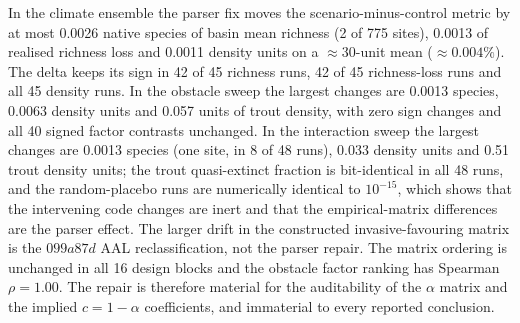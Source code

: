 \documentclass[11pt,a4paper]{article}
\begin{document}
In the climate ensemble the parser fix moves the scenario-minus-control metric by at most 0.0026 native species of basin mean richness (2 of 775 sites), 0.0013 of realised richness loss and 0.0011 density units on a $\approx30$-unit mean ($\approx0.004\%$). The delta keeps its sign in 42 of 45 richness runs, 42 of 45 richness-loss runs and all 45 density runs. In the obstacle sweep the largest changes are 0.0013 species, 0.0063 density units and 0.057 units of trout density, with zero sign changes and all 40 signed factor contrasts unchanged. In the interaction sweep the largest changes are 0.0013 species (one site, in 8 of 48 runs), 0.033 density units and 0.51 trout density units; the trout quasi-extinct fraction is bit-identical in all 48 runs, and the random-placebo runs are numerically identical to $10^{-15}$, which shows that the intervening code changes are inert and that the empirical-matrix differences are the parser effect. The larger drift in the constructed invasive-favouring matrix is the $099a87d$ AAL reclassification, not the parser repair. The matrix ordering is unchanged in all 16 design blocks and the obstacle factor ranking has Spearman $\rho=1.00$. The repair is therefore material for the auditability of the $\alpha$ matrix and the implied $c=1-\alpha$ coefficients, and immaterial to every reported conclusion.
\end{document}
